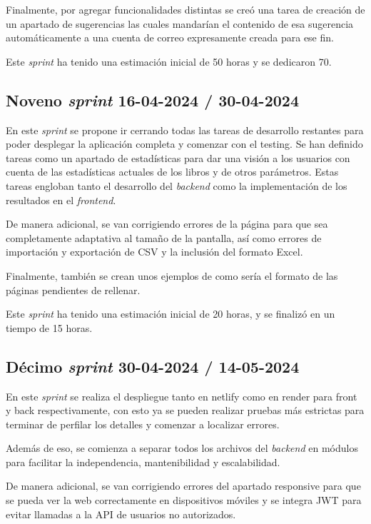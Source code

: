 Finalmente, por agregar funcionalidades distintas se creó una tarea de creación de un apartado de sugerencias las cuales mandarían el contenido de esa sugerencia automáticamente a una cuenta de correo expresamente creada para ese fin.

Este \textit{sprint} ha tenido una estimación inicial de 50 horas y se dedicaron 70.

\subsection{Noveno \textit{sprint} 16-04-2024 / 30-04-2024}
En este \textit{sprint} se propone ir cerrando todas las tareas de desarrollo restantes para poder desplegar la aplicación completa y comenzar con el testing.
Se han definido tareas como un apartado de estadísticas para dar una visión a los usuarios con cuenta de las estadísticas actuales de los libros y de otros parámetros.
Estas tareas engloban tanto el desarrollo del \textit{backend} como la implementación de los resultados en el \textit{frontend}.

De manera adicional, se van corrigiendo errores de la página para que sea completamente adaptativa al tamaño de la pantalla, así como errores de importación y exportación de CSV y la inclusión del formato Excel.

Finalmente, también se crean unos ejemplos de como sería el formato de las páginas pendientes de rellenar.

Este \textit{sprint} ha tenido una estimación inicial de 20 horas, y se finalizó en un tiempo de 15 horas.


\subsection{Décimo \textit{sprint} 30-04-2024 / 14-05-2024}
En este \textit{sprint} se realiza el despliegue tanto en netlify como en render para front y back respectivamente, con esto ya se pueden realizar pruebas más estrictas para terminar de perfilar los detalles y comenzar a localizar errores.

Además de eso, se comienza a separar todos los archivos del \textit{backend} en módulos para facilitar la independencia, mantenibilidad y escalabilidad.

De manera adicional, se van corrigiendo errores del apartado responsive para que se pueda ver la web correctamente en dispositivos móviles y se integra JWT para evitar llamadas a la API de usuarios no autorizados.

